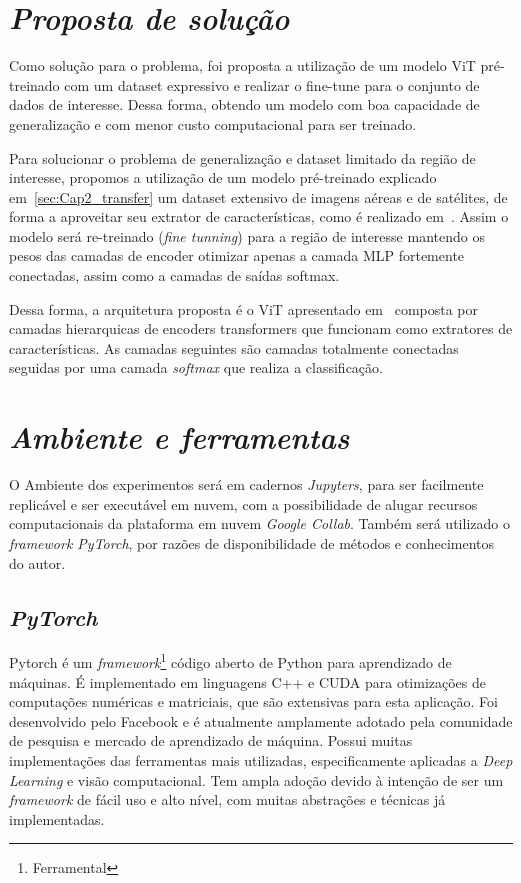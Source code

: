 \section{\textit{Proposta de solução}}\label{sec:Cap3_Proposta}

Como solução para o problema, foi proposta a utilização de um modelo ViT pré-treinado com um dataset expressivo e realizar o fine-tune para o conjunto de dados de interesse. Dessa forma, obtendo um modelo com boa capacidade de generalização e com menor custo computacional para ser treinado.

Para solucionar o problema de generalização e dataset limitado da região de interesse, propomos a utilização de um modelo pré-treinado explicado em~\ref{sec:Cap2_transfer} um dataset extensivo de imagens aéreas e de satélites, de forma a aproveitar seu extrator de características, como é realizado em~\cite{wang2022empirical}. Assim o modelo será re-treinado (\textit{fine tunning}) para a região de interesse mantendo os pesos das camadas de encoder otimizar apenas a camada MLP fortemente conectadas, assim como a camadas de saídas softmax. 

Dessa forma, a arquitetura proposta é o ViT apresentado em~\cite{wang2022empirical}
composta por camadas hierarquicas de encoders transformers  que funcionam como extratores de características. As camadas seguintes são camadas totalmente conectadas seguidas por uma camada \textit{softmax} que realiza a classificação.

\section{\textit{Ambiente e ferramentas}}\label{sec:Cap3_Ferramentas}


O Ambiente dos experimentos será em cadernos \textit{Jupyters}, para ser facilmente replicável e ser executável em nuvem, com a possibilidade de alugar recursos computacionais da plataforma em nuvem \textit{Google Collab}. Também será utilizado o \textit{framework PyTorch}, por razões de disponibilidade de métodos e conhecimentos do autor.

\subsection{\textit{PyTorch}}\label{sec:Cap2_PyTorch}
Pytorch é um \textit{framework}\footnote{Ferramental} código aberto de Python para aprendizado de máquinas. É implementado em linguagens C++ e CUDA para otimizações de computações numéricas e matriciais, que são extensivas para esta aplicação.
Foi desenvolvido pelo Facebook e é atualmente amplamente adotado pela comunidade de pesquisa e mercado de aprendizado de máquina. Possui muitas implementações das ferramentas mais utilizadas, especificamente aplicadas a \textit{Deep Learning} e visão computacional. Tem ampla adoção devido à intenção de ser um \textit{framework} de fácil uso e alto nível, com muitas abstrações e técnicas já implementadas.


